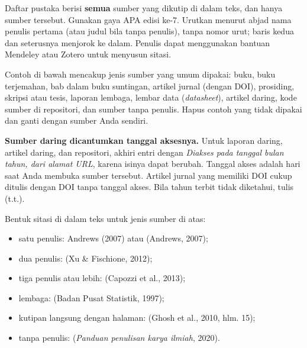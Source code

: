 Daftar pustaka berisi \textbf{semua} sumber yang dikutip di dalam teks, dan hanya sumber tersebut. Gunakan gaya APA edisi ke-7. Urutkan menurut abjad nama penulis pertama (atau judul bila tanpa penulis), tanpa nomor urut; baris kedua dan seterusnya menjorok ke dalam. Penulis dapat menggunakan bantuan Mendeley atau Zotero untuk menyusun sitasi.

Contoh di bawah mencakup jenis sumber yang umum dipakai: buku, buku terjemahan, bab dalam buku suntingan, artikel jurnal (dengan DOI), prosiding, skripsi atau tesis, laporan lembaga, lembar data (\textit{datasheet}), artikel daring, kode sumber di repositori, dan sumber tanpa penulis. Hapus contoh yang tidak dipakai dan ganti dengan sumber Anda sendiri.

\textbf{Sumber daring dicantumkan tanggal aksesnya.} Untuk laporan daring, artikel daring, dan repositori, akhiri entri dengan \textit{Diakses pada tanggal bulan tahun, dari alamat URL}, karena isinya dapat berubah. Tanggal akses adalah hari saat Anda membuka sumber tersebut. Artikel jurnal yang memiliki DOI cukup ditulis dengan DOI tanpa tanggal akses. Bila tahun terbit tidak diketahui, tulis (t.t.).

Bentuk sitasi di dalam teks untuk jenis sumber di atas:
\begin{itemize}
\item satu penulis: Andrews (2007) atau (Andrews, 2007);
\item dua penulis: (Xu \& Fischione, 2012);
\item tiga penulis atau lebih: (Capozzi et al., 2013);
\item lembaga: (Badan Pusat Statistik, 1997);
\item kutipan langsung dengan halaman: (Ghosh et al., 2010, hlm. 15);
\item tanpa penulis: (\textit{Panduan penulisan karya ilmiah}, 2020).
\end{itemize}

